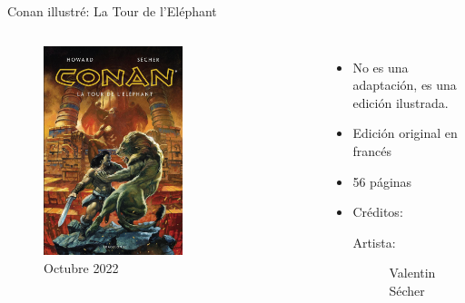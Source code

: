\begin{frame}{Conan illustré: La Tour de l’Eléphant}
	\begin{columns}
		\begin{figure}[htb]
			\centering
			\includegraphics[width=0.6\textwidth]{img/SecherTorre}
			\caption{Octubre 2022}
		\end{figure}
		\begin{itemize}
			\item No es una adaptación, es una edición ilustrada.
			\item Edición original en francés
			\item 56 páginas
			\item Créditos:
			\begin{description}
				\item[Artista:] Valentin Sécher
			\end{description}
		\end{itemize}
	\end{columns}
\end{frame}
